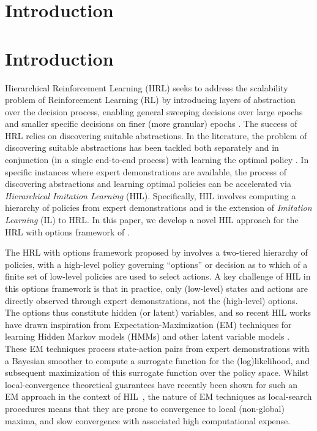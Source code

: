 \section{Introduction}
\section{Introduction}
\label{sec:introduction}
Hierarchical Reinforcement Learning (HRL) seeks to address the scalability problem of Reinforcement Learning (RL) by introducing layers of abstraction over the decision process, enabling  general sweeping decisions over large epochs and smaller specific decisions on finer (more granular) epochs \citep{SUTTON1999181, Barto2003}. The success of HRL relies on discovering suitable abstractions. 
In the literature, the problem of discovering suitable abstractions has been tackled both separately and in conjunction (in a single end-to-end process) with learning the optimal policy \citep{Barto2003}.
In specific instances where expert demonstrations are available, the process of discovering abstractions and learning optimal policies can be accelerated via \emph{Hierarchical Imitation Learning} (HIL).
Specifically, HIL involves computing a hierarchy of policies from expert demonstrations and is the extension of \emph{Imitation Learning} (IL) to HRL.
In this paper, we develop a novel HIL approach for the HRL with options framework of \citep{SUTTON1999181}.

The HRL with options framework proposed by \cite{SUTTON1999181} involves a two-tiered hierarchy of policies, with a high-level policy governing ``options'' or decision as to which of a finite set of low-level policies are used to select actions.
A key challenge of HIL in this options framework is that in practice, only (low-level) states and actions are directly observed through expert demonstrations, not the (high-level) options.
The options thus constitute hidden (or latent) variables, and so recent HIL works have drawn inspiration from Expectation-Maximization (EM) techniques for learning Hidden Markov models (HMMs) and other latent variable models \citep{Daniel2016,zhiyu20,Giammarino_2021}.
These EM techniques process state-action pairs from expert demonstrations with a Bayesian smoother to compute a surrogate function for the (log)likelihood, and subsequent maximization of this surrogate function over the policy space.
Whilst local-convergence theoretical guarantees have recently been shown for such an EM approach in the context of HIL~\citep{zhiyu20}, the nature of EM techniques as local-search procedures means that they are prone to convergence to local (non-global) maxima, and slow convergence with associated high computational expense.

